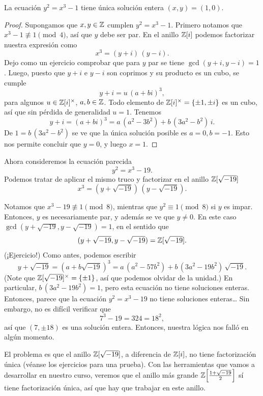 \begin{proposicion}
  La ecuación $y^2 = x^3 - 1$ tiene única solución entera $(x,y) = (1,0)$.

  \begin{proof}
    Supongamos que $x,y\in \mathbb{Z}$ cumplen $y^2 = x^3 - 1$. Primero notamos que
    $x^3 - 1 \not\equiv 1 \pmod{4}$, así que $y$ debe ser par. En el anillo
    $\mathbb{Z} [i]$ podemos factorizar nuestra expresión como
    $$x^3 = (y+i)\,(y-i).$$
    Dejo como un ejercicio comprobar que para $y$ par se tiene
    $\gcd (y+i,y-i) = 1$. Luego, puesto que $y+i$ e $y-i$ son coprimos y su
    producto es un cubo, se cumple
    $$y + i = u\,(a + bi)^3,$$
    para algunos $u \in \mathbb{Z} [i]^\times$, $a,b \in \mathbb{Z}$. Todo elemento de
    $\mathbb{Z} [i]^\times = \{ \pm 1, \pm i \}$ es un cubo, así que sin pérdida de
    generalidad $u = 1$. Tenemos
    $$y + i = (a + bi)^3 = a\,(a^2 - 3b^2) + b\,(3a^2 - b^2)\,i.$$
    De $1 = b\,(3a^2 - b^2)$ se ve que la única solución posible es
    $a = 0, b = -1$. Esto nos permite concluir que $y = 0$, y luego $x = 1$.
  \end{proof}
\end{proposicion}

Ahora consideremos la ecuación parecida
$$y^2 = x^3 - 19.$$
Podemos tratar de aplicar el mismo truco y factorizar en
el anillo $\mathbb{Z} [\sqrt{-19}]$
$$x^3 = (y + \sqrt{-19})\,(y - \sqrt{-19}).$$

Notamos que $x^3 - 19 \not\equiv 1 \pmod{8}$, mientras que
$y^2 \equiv 1 \pmod{8}$ si $y$ es impar. Entonces, $y$ es necesariamente par,
y además se ve que $y \ne 0$. En este caso
$\gcd (y + \sqrt{-19}, y - \sqrt{-19}) = 1$, en el sentido que
$$(y + \sqrt{-19}, y - \sqrt{-19}) = \mathbb{Z} [\sqrt{-19}].$$
(¡Ejercicio!) Como antes, podemos escribir
\[ y + \sqrt{-19} = (a + b\sqrt{-19})^3
       = a\,(a^2 - 57b^2) + b\,(3a^2 - 19b^2)\,\sqrt{-19}. \]
(Note que $\mathbb{Z} [\sqrt{-19}]^\times = \{ \pm 1 \}$, así que podemos olvidar de la
unidad.) En particular, $b\,(3a^2 - 19b^2) = 1$, pero esta ecuación no tiene
soluciones enteras. Entonces, parece que la ecuación $y^2 = x^3 - 19$ no tiene
soluciones enteras\dots{} Sin embargo, no es difícil verificar que
$$7^3 - 19 = 324 = 18^2,$$
así que $(7, \pm 18)$ es una solución entera. Entonces, nuestra lógica nos
falló en algún momento.

\vspace{1em}

El problema es que el anillo $\mathbb{Z} [\sqrt{-19}]$, a diferencia de $\mathbb{Z} [i]$,
no tiene factorización única (véanse los ejercicios para una prueba).
Con las herramientas que vamos a desarrollar en nuestro curso, veremos que
el anillo más grande $\mathbb{Z} \Bigl[\frac{1+\sqrt{-19}}{2}\Bigr]$ sí tiene
factorización única, así que hay que trabajar en este anillo.

